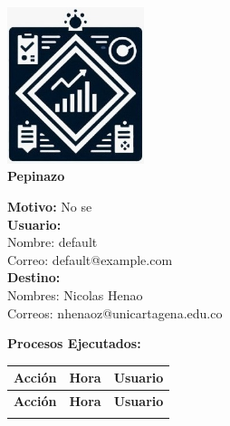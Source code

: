 \documentclass[a4paper,10pt]{article}
\begin{document}
\begin{center}
    \includegraphics[width=0.3\textwidth]{logo.jpeg} %
    \\[1em]
    {\LARGE \textbf{Pepinazo}}
\end{center}

\vspace{1em}

\noindent \textbf{Motivo:} No se \\[0.5em]

\noindent \textbf{Usuario:} \\
Nombre: default \\
Correo: default@example.com \\[0.5em]

\noindent \textbf{Destino:} \\
Nombres: Nicolas Henao \\
Correos: nhenaoz@unicartagena.edu.co \\[0.5em]

\vspace{1.5em}

\noindent \textbf{Procesos Ejecutados:} \\
\begin{longtable}{|p{}|p{}|p{}|}
    \hline
    \textbf{Acción} & \textbf{Hora} & \textbf{Usuario} \\
    \hline
    \endfirsthead
    \hline
    \textbf{Acción} & \textbf{Hora} & \textbf{Usuario} \\
    \hline
    \endhead
    \hline
    \endfoot

\end{longtable}

\vspace{1.5em}
\end{document}
